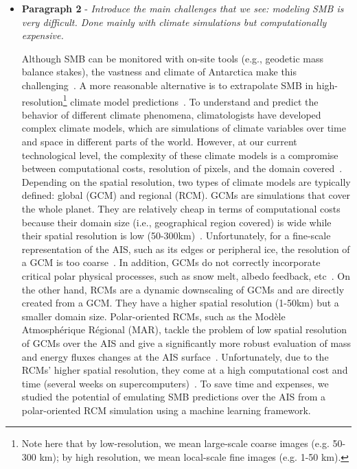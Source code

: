\documentclass[a4paper,11pt,oneside]{report}
\begin{document}
\begin{itemize}
    
    \item \textbf{Paragraph 2} - \textit{Introduce the main challenges that we see: modeling SMB is very difficult. Done mainly with climate simulations but computationally expensive.}
    
    Although SMB can be monitored with on-site tools (e.g., geodetic mass balance stakes), the vastness and climate of Antarctica make this challenging~\cite{Lenaerts2019}. A more reasonable alternative is to extrapolate SMB in high-resolution\footnote{Note here that by low-resolution, we mean large-scale coarse images (e.g. 50-300 \si{km}); by high resolution, we mean local-scale fine images (e.g. 1-50 \si{km}).} climate model predictions~\cite{Mottram}. To understand and predict the behavior of different climate phenomena, climatologists have developed complex climate models, which are simulations of climate variables over time and space in different parts of the world. However, at our current technological level, the complexity of these climate models is a compromise between computational costs, resolution of pixels, and the domain covered~\cite{Doury}. Depending on the spatial resolution, two types of climate models are typically defined: global (GCM) and regional (RCM). GCMs are simulations that cover the whole planet. They are relatively cheap in terms of computational costs because their domain size (i.e., geographical region covered) is wide while their spatial resolution is low (50-300\si{km})~\cite{Doury}. Unfortunately, for a fine-scale representation of the AIS, such as its edges or peripheral ice, the resolution of a GCM is too coarse~\cite{Kittel, Seroussi}. In addition, GCMs do not correctly incorporate critical polar physical processes, such as snow melt, albedo feedback, etc~\cite{Kittel, Lenaerts2016}. On the other hand, RCMs are a dynamic downscaling of GCMs and are directly created from a GCM. They have a higher spatial resolution (1-50\si{km}) but a smaller domain size. Polar-oriented RCMs, such as the Modèle Atmosphérique Régional (MAR), tackle the problem of low spatial resolution of GCMs over the AIS and give a significantly more robust evaluation of mass and energy fluxes changes at the AIS surface~\cite{Kittel, Fyke2018}. Unfortunately, due to the RCMs' higher spatial resolution, they come at a high computational cost and time (several weeks on supercomputers)~\cite{Doury}. To save time and expenses, we studied the potential of emulating SMB predictions over the AIS from a polar-oriented RCM simulation using a machine learning framework. 


\end{itemize}
\end{document}
